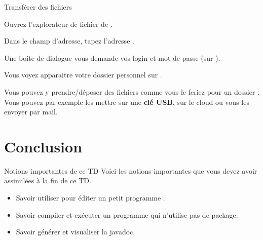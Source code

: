 \documentclass[a4paper,11pt]{style-esi/td}
\begin{document}
	\begin{Tutoriel}{Transférer des fichiers}
	\begin{steps}		
		\item 
			Ouvrez l'explorateur de fichier de .
		\item 
			Dans le champ d'adresse, tapez l'adresse .
		\item 
			Une boite de dialogue vous demande vos login et mot de passe 
			(sur ).
		\item 
			Vous voyez apparaitre votre dossier personnel sur . 
		\item 
			Vous pouvez y prendre/déposer des fichiers comme vous le 
			feriez pour un dossier . 
			Vous pouvez par exemple les mettre sur une \textbf{clé USB},
			sur le cloud ou vous les envoyer par mail.
	\end{steps}
	\end{Tutoriel}			

\section{Conclusion}

	\begin{theorie}{Notions importantes de ce TD}
		Voici les notions importantes que vous devez avoir assimilées à la fin de ce TD.
		\begin{itemize}
		\item 
			Savoir utiliser  pour éditer un petit programme .
		\item 
			Savoir compiler et exécuter un programme  
			qui n'utilise pas de package.
		\item 
			Savoir générer et visualiser la javadoc.
		\end{itemize}
	\end{theorie}


		
\end{document}
